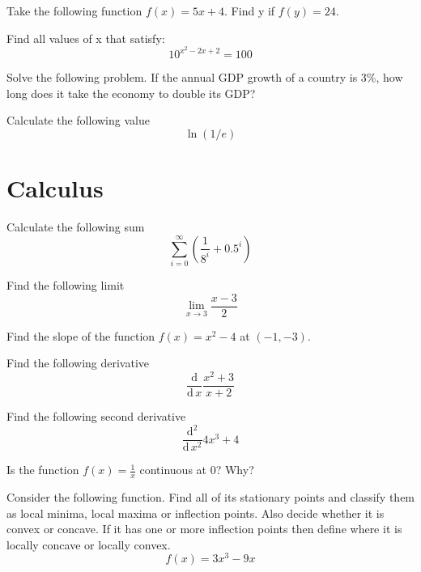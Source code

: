 \documentclass[10pt]{article}
\newenvironment{problem}[2][Problem]{\begin{trivlist}
\item[\hskip \labelsep {\bfseries #1}\hskip \labelsep {\bfseries #2.}]}{\end{trivlist}}
\begin{document}
\begin{problem}{2.2}
Take the following function $f(x)=5x+4$. Find y if $f(y)=24$.
\end{problem}

\begin{problem}{2.3}
Find all values of x that satisfy:
$$10^{x^2-2x+2}=100$$
\end{problem}

\begin{problem}{2.4}
Solve the following problem. If the annual GDP growth of a country is 3\%, how long does it take the economy to double its GDP?
\end{problem}

\begin{problem}{2.5}
Calculate the following value
$$\ln(1/e)$$
\end{problem}

\section{Calculus}

\begin{problem}{3.1}
Calculate the following sum
$$\sum\limits_{i=0}^{\infty} \left( \frac{1}{8^i}+0.5^i\right)$$
\end{problem}

\begin{problem}{3.2}
Find the following limit
$$\lim\limits_{x \rightarrow 3}\frac{x-3}{2}$$
\end{problem}

\begin{problem}{3.3}
Find the slope of the function $f(x)=x^2-4$ at $(-1,-3)$.
\end{problem}

\begin{problem}{3.4}
Find the following derivative
$$\frac{\mathrm{d}}{\mathrm{d}\, x} \frac{x^2+3}{x+2}$$
\end{problem}

\begin{problem}{3.5}
Find the following second derivative
 $$\frac{\mathrm{d^2}}{\mathrm{d}\, x^2} 4x^3+4$$
\end{problem}

\begin{problem}{3.6}
Is the function  $f(x)=\frac{1}{x}$ continuous at $0$? Why?
\end{problem}

\begin{problem}{3.7}
Consider the following function. Find all of its stationary points and classify them as local minima, local maxima or inflection points. Also decide whether it is convex or concave. If it has one or more inflection points then define where it is locally concave or locally convex.
$$f(x)=3x^3-9x$$
\end{problem}
\end{document}
